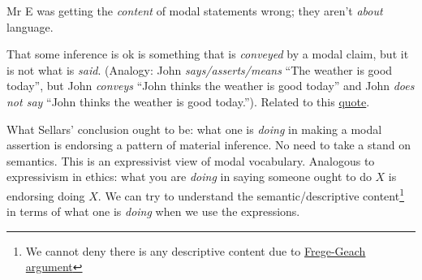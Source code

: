 Mr E was getting the \emph{content} of modal statements wrong; they aren't \emph{about} language.

That some inference is ok is something that is \emph{conveyed} by a modal claim, but it is not what is \emph{said}. (Analogy: John \emph{says/asserts/means} ``The weather is good today'', but John \emph{conveys} ``John thinks the weather is good today'' and John \emph{does not say} ``John thinks the weather is good today.''). Related to this \href{doc/phil/People/Sellars/Quotes/Modalities and norms}{quote}.


What Sellars' conclusion ought to be: what one is \emph{doing} in making a modal assertion is endorsing a pattern of material inference. No need to take a stand on semantics. This is an expressivist view of modal vocabulary. Analogous to expressivism in ethics: what you are \emph{doing} in saying someone ought to do $X$ is endorsing doing $X$. We can try to understand the semantic/descriptive content\footnote{We cannot deny there is any descriptive content due to \href{doc/phil/Phil Problems/Frege Geach}{Frege-Geach argument}} in terms of what one is \emph{doing} when we use the expressions.